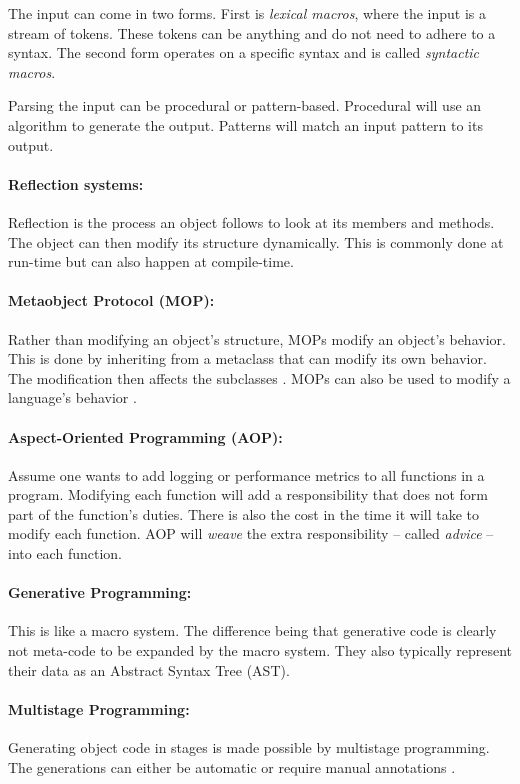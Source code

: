 The input can come in two forms.
First is \textit{lexical macros}, where the input is a stream of tokens.
These tokens can be anything and do not need to adhere to a syntax.
The second form operates on a specific syntax and is called \textit{syntactic macros}.

Parsing the input can be procedural or pattern-based.
Procedural will use an algorithm to generate the output.
Patterns will match an input pattern to its output.

\paragraph{Reflection systems:}
Reflection is the process an object follows to look at its members and methods.
The object can then modify its structure dynamically.
This is commonly done at run-time but can also happen at compile-time.

\paragraph{Metaobject Protocol (MOP):}
Rather than modifying an object's structure, MOPs modify an object's behavior.
This is done by inheriting from a metaclass that can modify its own behavior.
The modification then affects the subclasses \cite{lee_95_01}.
MOPs can also be used to modify a language's behavior \cite{seaton_15_01}.

\paragraph{Aspect-Oriented Programming (AOP):}
Assume one wants to add logging or performance metrics to all functions in a program.
Modifying each function will add a responsibility that does not form part of the function's duties.
There is also the cost in the time it will take to modify each function.
AOP will \textit{weave} the extra responsibility -- called \textit{advice} -- into each function.

\paragraph{Generative Programming:}
This is like a macro system.
The difference being that generative code is clearly not meta-code to be expanded by the macro system.
They also typically represent their data as an Abstract Syntax Tree (AST). 

\paragraph{Multistage Programming:}
Generating object code in stages is made possible by multistage programming.
The generations can either be automatic or require manual annotations \cite{sheard_01_01, taha_04_01}.

